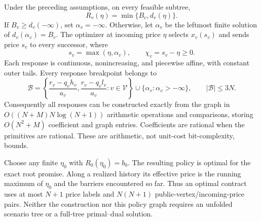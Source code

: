 \begin{theorem}\label{thm:finite-price}
Under the preceding assumptions, on every feasible subtree,
\begin{equation}\label{eq:response-identity}
 R_v(\eta)=\min\{B_v,d_v(\eta)\}.
\end{equation}
If $B_v\geq d_v(-\infty)$, set $\alpha_v=-\infty$. Otherwise, let $\alpha_v$ be the leftmost finite solution of $d_v(\alpha_v)=B_v$. The optimizer at incoming price $\eta$ selects $x_v(s_v)$ and sends price $s_v$ to every successor, where
\begin{equation}\label{eq:reflection}
 s_v=\max(\eta,\alpha_v),\qquad \chi_v=s_v-\eta\geq0.
\end{equation}
Each response is continuous, nonincreasing, and piecewise affine, with constant outer tails. Every response breakpoint belongs to
\begin{equation}\label{eq:alphabet-knots}
 \mathcal B=\left\{\frac{r_v-q_vh_v}{a_v},
 \frac{r_v-q_vl_v}{a_v}:v\in\mathcal V\right\}
 \cup\{\alpha_v:\alpha_v> -\infty\},\qquad |\mathcal B|\leq3N.
\end{equation}
Consequently all responses can be constructed exactly from the graph in
$O((N+M)N\log(N+1))$ arithmetic operations and comparisons, storing $O(N^2+M)$ coefficient and graph entries. Coefficients are rational when the primitives are rational. These are arithmetic, not unit-cost bit-complexity, bounds.

Choose any finite $\eta_0$ with $R_0(\eta_0)=b_0$. The resulting policy is optimal for the exact root promise. Along a realized history its effective price is the running maximum of $\eta_0$ and the barriers encountered so far. Thus an optimal contract uses at most $N+1$ price labels and $N(N+1)$ public-vertex/incoming-price pairs. Neither the construction nor this policy graph requires an unfolded scenario tree or a full-tree primal--dual solution.
\end{theorem}


